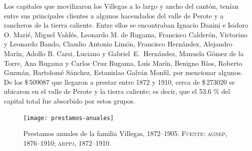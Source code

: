 \documentclass[14pt,twoside,final]{extbook} %
\begin{document}
Los capitales que movilizaron los Villegas a lo largo y ancho del cantón, tenían entre sus principales clientes a algunos hacendados del valle de Perote y a rancheros de la tierra caliente. Entre ellos se encontraban Ignacio Danini e Isidoro O. Marié, Miguel Valdés, Leonardo M. de Rugama, Francisco Calderón, Victorino y Leonardo Bando, Claudio Antonio Limón, Francisco Hernández, Alejandro Marín, Adolfo B. Carsi, Luciano y Gabriel~E.~Hernández, Manuela Gómez de la Torre, Ana Rugama y Carlos Cruz Rugama, Luís Marín, Benigno Ríos, Roberto Guzmán, Bartolomé Sánchez, Estanislao Galván Monfil, por mencionar algunos. De los \$\,509087 que llegaron a prestar entre 1872 y 1910, cerca de \$\,273020 se ubicaron en el valle de Perote y la tierra caliente; es decir, que el 53.6 \% del capital total fue absorbido por estos grupos.
\begin{figure}
\texttt{[image: prestamos-anuales]}
\caption[Préstamos anuales de la familia Villegas, 1872--1905]{Prestamos anuales de la familia Villegas, 1872--1905. \textsc{Fuente:} \textsc{agnep}, 1876--1910; \textsc{arppj, 1872--1910}.}
\label{fig:prestamos-anuales-familia-villegas}
\end{figure}
\end{document}
